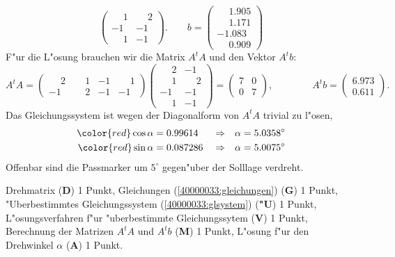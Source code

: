 \begin{loesung}
\[\begin{pmatrix}
\phantom{-}1&\phantom{-}2\\
         - 1&         - 1\\
\phantom{-}1&         - 1
\end{pmatrix}.
\qquad
b=
\begin{pmatrix}
\phantom{-}1.905\\
\phantom{-}1.171\\
         - 1.083\\
\phantom{-}0.909
\end{pmatrix}
\]
F"ur die L"osung brauchen wir die Matrix $A^tA$ und den Vektor $A^tb$:
\[
A^tA=
\begin{pmatrix}
\phantom{-}2&\phantom{-}1&-1&\phantom{-}1\\
         - 1&\phantom{-}2&-1&         - 1
\end{pmatrix}
\begin{pmatrix}
\phantom{-}2&         - 1\\
\phantom{-}1&\phantom{-}2\\
         - 1&         - 1\\
\phantom{-}1&         - 1
\end{pmatrix}
=
\begin{pmatrix}
7&0\\
0&7
\end{pmatrix},
\qquad
\qquad
A^tb
=
\begin{pmatrix}
6.973\\ 0.611
\end{pmatrix}.
\]
Das Gleichungssystem ist wegen der Diagonalform von $A^tA$ trivial zu l"osen,
\begin{align*}
\color{red} \cos\alpha&=0.99614
&&\Rightarrow&\alpha&=5.0358^\circ
\\
\color{red} \sin\alpha&=0.087286
&&\Rightarrow&
\alpha&=5.0075^\circ
\end{align*}
Offenbar sind die Passmarker um $5^\circ$ gegen"uber der Solllage verdreht.
\end{loesung}

\begin{bewertung}
Drehmatrix ({\bf D}) 1 Punkt,
Gleichungen (\ref{40000033:gleichungen}) ({\bf G}) 1 Punkt,
"Uberbestimmtes Gleichungssystem (\ref{40000033:glsystem}) ({\bf "U}) 1 Punkt,
L"osungsverfahren f"ur "uberbestimmte Gleichungssytem ({\bf V}) 1 Punkt,
Berechnung der Matrizen $A^tA$ und $A^tb$ ({\bf M}) 1 Punkt,
L"osung f"ur den Drehwinkel $\alpha$ ({\bf A}) 1 Punkt.
\end{bewertung}

